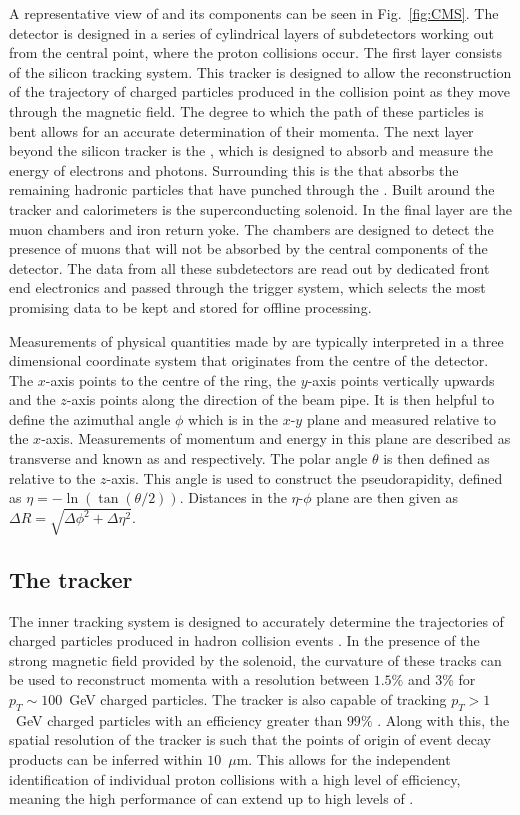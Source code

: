 A representative view of \CMS and its components can be seen in
Fig.~\ref{fig:CMS}. The detector is designed in a series of
cylindrical layers of subdetectors working out from the central point,
where the proton collisions occur. The first layer consists of the
silicon tracking system. This tracker is designed to allow the
reconstruction of the trajectory of charged particles produced in the
collision point as they move through the magnetic field. The degree to
which the path of these particles is bent allows for an accurate
determination of their momenta. The next layer beyond the silicon
tracker is the \ECAL, which is designed to absorb and measure the
energy of electrons and photons. Surrounding this is the \HCAL that
absorbs the remaining hadronic particles that have punched through the
\ECAL. Built around the tracker and calorimeters is the superconducting
solenoid. In the final layer are the muon chambers and iron return
yoke. The chambers are designed to detect the presence of muons that
will not be absorbed by the central components of the detector. The
data from all these subdetectors are read out by dedicated front end
electronics and passed through the \CMS trigger system, which
selects the most promising data to be kept and stored for offline
processing. 

Measurements of physical quantities made by \CMS are typically
interpreted in a three dimensional coordinate system that originates
from the centre of the detector. The $x$-axis points to the
centre of the \LHC ring, the $y$-axis points vertically upwards and
the $z$-axis points along the direction of the \LHC beam pipe. It is
then helpful to define the azimuthal angle $\phi$ which is in the
$x$-$y$ plane and measured relative to the $x$-axis. Measurements of
momentum and energy in this plane are described as transverse and
known as \pt and \Et respectively. The polar angle $\theta$ is then
defined as relative to the $z$-axis. This angle is used to construct
the pseudorapidity, defined as $\eta=-\ln(\tan(\theta/2))$. Distances in
the $\eta$-$\phi$ plane are then given as $\Delta R =
\sqrt{\Delta\phi^2+\Delta\eta^2}$.

\subsection{The tracker} 
\label{sec:tracker}

The \CMS inner tracking system is designed to accurately determine the
trajectories of charged particles produced in hadron collision events
\cite{Karimaki:368412}. In the presence of the strong magnetic field
provided by the \CMS solenoid, the curvature of these tracks can be
used to reconstruct momenta with a resolution between $1.5\%$ and
$3\%$ for $p_T\sim 100$~GeV charged particles. The tracker is also
capable of tracking \mbox{$p_T>1$~GeV} charged particles with an
efficiency greater than $99\%$ \cite{Bayatian:2006zz}. Along with
this, the spatial resolution of the tracker is such that the points of
origin of event decay products can be inferred within $10$~$\mu$m.
This allows for the independent identification of individual proton
collisions with a high level of efficiency, meaning the high
performance of \CMS can extend up to high levels
of \PU.%

